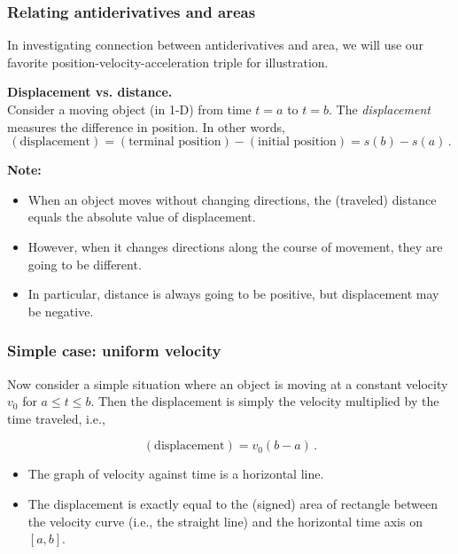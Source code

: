\documentclass[10pt,t,handout,ignorenonframetext,aspectratio=169]{beamer}
\title[\course]{\lecTitle}
\institute[Ohio State]
{
  \medskip
}
\date[\week]{\semester}
\author{Tae Eun Kim, Ph.D.}
\begin{document}
\begin{frame}
  \titlepage
\end{frame}

\begin{frame}
  \frametitle{Relating antiderivatives and
    areas}

  In investigating connection between antiderivatives and area, we
  will use our favorite position-velocity-acceleration triple for
  illustration.

  \vs

  \textbf{Displacement vs. distance.}\\
  \vspace{0.5em}
  Consider a moving object (in 1-D) from time $t = a$ to $t = b$. The
  \textit{displacement} measures the difference in position. In other
  words,
  \[
    (\text{displacement})
    = (\text{terminal position}) - (\text{initial position})
    = s(b) - s(a) \,.
  \]

  \textbf{Note:}
  \begin{itemize}
  \item When an object moves without changing directions, the (traveled)
    distance equals the absolute value of displacement.
  \item However, when it changes directions along the course of
    movement, they are going to be different.
  \item In particular, distance is always going to be positive, but
    displacement may be negative.
  \end{itemize}
\end{frame}

\begin{frame}
  \frametitle{Simple case:  uniform velocity}
  Now consider a simple situation where an object is moving at a
  constant velocity $v_{0}$ for $a \le t \le b$. Then the displacement
  is simply the velocity multiplied by the time traveled, i.e.,

  \[
    (\text{displacement}) = v_0 (b-a)\,. \tag{constant velocity}
  \]

  \begin{itemize}
  \item The graph of velocity against time is a horizontal line.
  \item The displacement is exactly equal to the (signed) area of rectangle
    between the velocity curve (i.e., the straight line) and the
    horizontal time axis on $[a, b]$.
  \end{itemize}
\end{frame}
\end{document}
